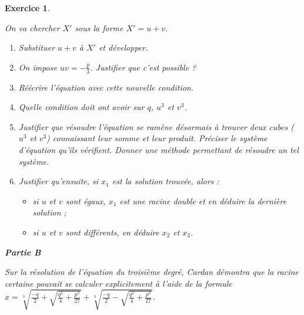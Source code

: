 \documentclass[11pt,a4paper,french]{article}
\theoremstyle{break}
\theoremstyle{plain}
\newtheorem{exerciceT}{Exercice}
\theoremstyle{nonumberplain}
\theoremstyle{nonumberbreak}
\newenvironment{exercice}{\begin{framed}\begin{exerciceT}}{\end{exerciceT}\end{framed}}
\begin{document}
\begin{exercice}
\begin{enumerate}
      On va chercher $X'$ sous la forme $X' = u + v$.
      \begin{enumerate}
        \item Substituer $u + v$ à $X'$ et développer.
        \item On impose $uv = -\frac{p}3$. Justifier que c'est possible
          ?
        \item Réécrire l'équation avec cette nouvelle condition.
        \item Quelle condition doit ont avoir sur $q$, $u^3$ et $v^3$.
        \item Justifier que résoudre l'équation se ramène désormais à
          trouver deux cubes ($u^3$ et $v^3$) connaissant leur somme et
          leur produit.
          Préciser le système d'équation qu'ils vérifient.
          Donner une méthode permettant de résoudre un tel système.
        \item Justifier qu'ensuite, si $x_1$ est la solution trouvée,
          alors :
          \begin{itemize}
            \item si $u$ et $v$ sont égaux, $x_1$ est une racine double
              et en déduire la dernière solution ;
            \item si $u$ et $v$ sont différents, en déduire $x_2$ et
              $x_3$.
          \end{itemize}
      \end{enumerate}
  \end{enumerate}

  \noindent\textbf{Partie B}

  Sur la résolution de l'équation du troisième degré, Cardan démontra
  que la racine certaine pouvait se calculer explicitement à l'aide de
  la formule $x = \sqrt[3]{\frac{-q}2 + \sqrt{\frac{q^2}4 +
  \frac{p^3}{27}}} + \sqrt[3]{\frac{-q}2 - \sqrt{\frac{q^2}4 +
  \frac{p^3}{27}}}$.


\end{exercice}
\end{document}
